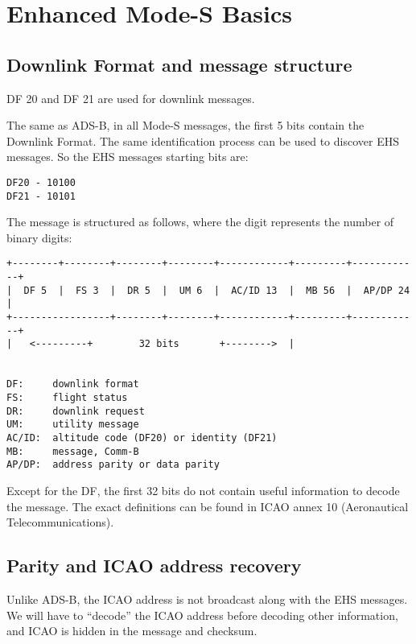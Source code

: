 \section{Enhanced Mode-S Basics}\label{introduction}

\subsection{Downlink Format and message
structure}\label{downlink-format-and-message-structure}

DF 20 and DF 21 are used for downlink messages.

The same as ADS-B, in all Mode-S messages, the first 5 bits contain the Downlink Format. The same identification process can be used to discover EHS messages. So the EHS messages starting bits are:

\begin{verbatim}
DF20 - 10100
DF21 - 10101
\end{verbatim}

The message is structured as follows, where the digit represents the number of binary digits:

\begin{verbatim}
+--------+--------+--------+--------+------------+---------+------------+
|  DF 5  |  FS 3  |  DR 5  |  UM 6  |  AC/ID 13  |  MB 56  |  AP/DP 24  |
+-----------------+--------+--------+------------+---------+------------+
|   <---------+        32 bits       +-------->  |


DF:     downlink format
FS:     flight status
DR:     downlink request
UM:     utility message
AC/ID:  altitude code (DF20) or identity (DF21)
MB:     message, Comm-B
AP/DP:  address parity or data parity
\end{verbatim}

Except for the DF, the first 32 bits do not contain useful information to decode the message. The exact definitions can be found in ICAO annex 10 (Aeronautical Telecommunications).

\subsection{Parity and ICAO address
recovery}\label{parity-and-icao-address-recovery}

Unlike ADS-B, the ICAO address is not broadcast along with the EHS messages. We will have to ``decode'' the ICAO address before decoding other information, and ICAO is hidden in the message and checksum.

